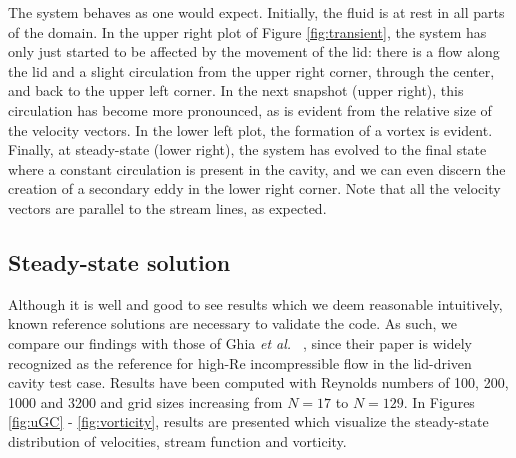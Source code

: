 \documentclass[final,3p,twocolumn]{elsarticle}
\begin{document}
The system behaves as one would expect. Initially, the fluid is at rest in all
parts of the domain. In the upper right plot of Figure \ref{fig:transient}, the
system has only just started to be affected by the movement of the lid: there
is a flow along the lid and a slight circulation from the upper right corner,
through the center, and back to the upper left corner. In the next snapshot
(upper right), this circulation has become more pronounced, as is evident from
the relative size of the velocity vectors. In the lower left plot, the
formation of a vortex is evident. Finally, at steady-state (lower right), the
system has evolved to the final state where a constant circulation is present
in the cavity, and we can even discern the creation of a secondary eddy in the
lower right corner. Note that all the velocity vectors are parallel to the stream
lines, as expected. 

\subsection{Steady-state solution}
\label{subsec:steady}

Although it is well and good to see results which we deem reasonable
intuitively, known reference solutions are necessary to validate the code. As
such, we compare our findings with those of Ghia {\em et al.\ }
\cite{ghia1982high}, since their paper is widely recognized as the reference
for high-Re incompressible flow in the lid-driven cavity test case. Results
have been computed with Reynolds numbers of 100, 200, 1000 and 3200 and grid
sizes increasing from $N=17$ to $N=129$. In Figures \ref{fig:uGC} -
\ref{fig:vorticity}, results are presented which visualize the steady-state
distribution of velocities, stream function and vorticity. 
\end{document}
